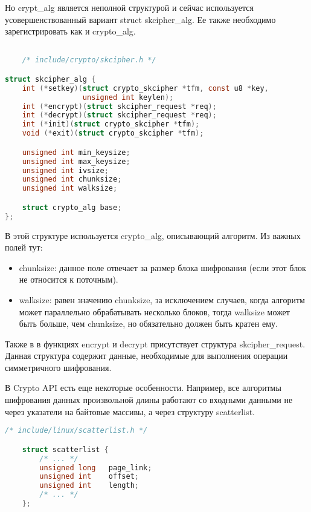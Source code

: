 Но crypt\_alg является неполной структурой и сейчас используется усовершенствованный вариант struct skcipher\_alg.
Ее также необходимо зарегистрировать как и crypto\_alg.

\begin{lstlisting}[language=c, label=some-code, caption=Структура skcipher\_alg]

    /* include/crypto/skcipher.h */

struct skcipher_alg {
    int (*setkey)(struct crypto_skcipher *tfm, const u8 *key,
                  unsigned int keylen);
    int (*encrypt)(struct skcipher_request *req);
    int (*decrypt)(struct skcipher_request *req);
    int (*init)(struct crypto_skcipher *tfm);
    void (*exit)(struct crypto_skcipher *tfm);

    unsigned int min_keysize;
    unsigned int max_keysize;
    unsigned int ivsize;
    unsigned int chunksize;
    unsigned int walksize;

    struct crypto_alg base;
};

\end{lstlisting}

В этой структуре используется crypto\_alg, описывающий алгоритм.
Из важных полей тут:

\begin{itemize}
    \item chunksize: данное поле отвечает за размер блока шифрования (если этот блок не относится к поточным).
    \item walksize: равен значению chunksize, за исключением случаев, когда алгоритм может параллельно обрабатывать несколько блоков, тогда walksize может быть больше, чем chunksize, но обязательно должен быть кратен ему.
\end{itemize}

Также в в функциях encrypt и decrypt присутствует структура skcipher\_request.
Данная структура содержит данные, необходимые для выполнения операции симметричного шифрования.

В Crypto API есть еще некоторые особенности.
Например, все алгоритмы шифрования данных произвольной длины работают со входными данными не через указатели на байтовые массивы, а через структуру scatterlist.

\begin{lstlisting}[language=c, label=some-code, caption=Структура skcipher\_alg]
    /* include/linux/scatterlist.h */

    struct scatterlist {
        /* ... */
        unsigned long   page_link;
        unsigned int    offset;
        unsigned int    length;
        /* ... */
    };
\end{lstlisting}

